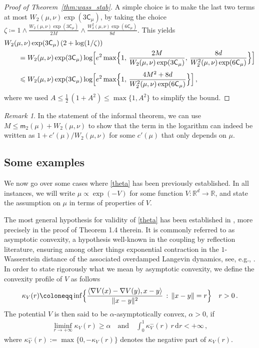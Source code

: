\documentclass[12pt]{article}
\newcommand{\RR}{\mathbb{R}}
\newcommand{\R}{\RR}
\newcommand{\1}{\mathds{1}}
\newcommand*{\defeq}{\coloneqq}
\newcommand*{\rd}{\mathrm{d}}
\newcommand*{\dd}{\, \rd}
\newcommand{\deq}{\coloneqq}
\renewcommand{\geq}{\geqslant}
\renewcommand{\le}{\leqslant}
\newcommand{\mom}{\mathsf m_2}
\theoremstyle{plain}
\theoremstyle{definition}
\theoremstyle{remark}
\newtheorem{remark}[theorem]{Remark}
\begin{document}
\begin{proof}[Proof of Theorem~\ref{thm:wass_stab}]
A simple choice is to make the last two terms at most $W_2(\mu,\nu)\exp(3\mathsf C_\mu)$, by taking the choice $\zeta \deq 1 \wedge \frac{W_2(\mu,\nu) \exp(3\mathsf C_\mu)}{2M} \wedge \frac{W_2^2(\mu,\nu) \exp(6\mathsf C_\mu)}{8d}$.
This yields
\begin{align*}
    &W_2(\mu,\nu) \exp(3\mathsf C_\mu)\,(2 + \log(1/\zeta)) \\
    &\qquad = W_2(\mu,\nu) \exp(3\mathsf C_\mu) \log\Bigl[e^2\max\Bigl\{1,\, \frac{2M}{W_2(\mu,\nu)\exp(3\mathsf C_\mu)},\, \frac{8d}{W_2^2(\mu,\nu)\exp(6\mathsf C_\mu)}\Bigr\}\Bigr] \\[0.25em]
    &\qquad \le W_2(\mu,\nu) \exp(3\mathsf C_\mu) \log\Bigl[e^2\max\Bigl\{1,\, \frac{4M^2 + 8d}{W_2^2(\mu,\nu)\exp(6\mathsf C_\mu)}\Bigr\}\Bigr]\,,
\end{align*}
where we used $A \le \frac{1}{2}\,(1+A^2) \le \max\{1,A^2\}$ to simplify the bound.
\end{proof}

\begin{remark}
    In the statement of the informal theorem, we can use $M \le \mom(\mu) + W_2(\mu,\nu)$ to show that the term in the logarithm can indeed be written as $1+c'(\mu)/W_2(\mu,\nu)$ for some $c'(\mu)$ that only depends on $\mu$.
\end{remark}
\subsection{Some examples}\label{sec:ex}

We now go over some cases where \eqref{theta} has been previously established. In all instances, we will write $\mu \propto \exp(-V)$ for some function $V :\R^d \to \R$, and state the assumption on $\mu$ in terms of properties of $V$.

The most general hypothesis for validity of \eqref{theta} has been established in \cite{chaintron_propagation_2025}, more precisely in the proof of Theorem 1.4 therein. It is commonly referred to as asymptotic convexity, a hypothesis well-known in the coupling by reflection literature, ensuring among other things exponential contraction in the $1$-Wasserstein distance of the associated overdamped Langevin dynamics, see, e.g., \cite{eberle2016reflection}. In order to state rigorously what we mean by asymptotic convexity, we define the convexity profile of $V$ as follows
\begin{align*}
    \kappa_V(r) \defeq \inf\Bigl\{ \frac{\langle \nabla {V}(x) - \nabla {V}(y), x-y \rangle}{\|x-y\|^2} \, : \, \|x-y\| = r\Bigr\} \quad r>0\, .
\end{align*}
The potential $V$ is then said to be $\alpha$-asymptotically convex, $\alpha>0$, if
\begin{align*}
    \liminf_{r \rightarrow + \infty} \kappa_V(r) \geq \alpha \quad \text{and} \quad \int_0^1 \kappa_V^-(r)\, r \dd r < + \infty \,,
\end{align*}
where $\kappa_V^-(r) := \max\{0,-\kappa_V(r)\}$ denotes the negative part of $\kappa_V(r)$.
\end{document}
